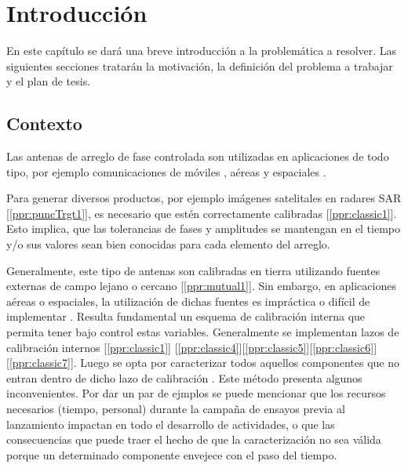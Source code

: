 
\chapter{Introducción} %

\label{ch:introduccion} %

En este capítulo se dará una breve introducción a la problemática a resolver. Las siguientes secciones tratarán la motivación,
la definición del problema a trabajar y el plan de tesis.

\section{Contexto}
    
Las antenas de arreglo de fase controlada \cite{Fenn2000} son utilizadas en aplicaciones de todo tipo, por ejemplo comunicaciones 
de móviles \cite{Chen2012}, aéreas 
								   \cite{ppr:punc-ext1} y espaciales \cite{Shimada1995}\cite{Makhoul2012}. 

Para generar diversos productos, por ejemplo imágenes satelitales en radares SAR 
[\ref{ppr:puncTrgt1}], es necesario que estén 
correctamente calibradas 
[\ref{ppr:classic1}]\cite{Seifert1996}\cite{Dall1994}. Esto implica, que las tolerancias de
fases y amplitudes se mantengan en el tiempo y/o sus valores sean bien conocidas
para cada elemento del arreglo.

Generalmente, este tipo de antenas son calibradas en tierra utilizando fuentes 
externas de campo lejano o cercano [\ref{ppr:mutual1}]. Sin embargo, en 
aplicaciones aéreas o espaciales, la utilización de dichas fuentes es impráctica
o difícil de implementar \cite{Aumann1989}. Resulta fundamental un esquema de
calibración interna que permita tener bajo control estas variables. Generalmente
se implementan lazos de calibración internos [\ref{ppr:classic1}]
\cite{Seifert1996}\cite{Dall1994}\cite{Freeman1995}
[\ref{ppr:classic4}][\ref{ppr:classic5}][\ref{ppr:classic6}]
\cite{Srivastava1996}[\ref{ppr:classic7}]\cite{Makhoul2012}. 
Luego se opta por caracterizar todos aquellos componentes que no entran dentro 
de dicho lazo de calibración \cite{Freeman1995}.
Este método presenta algunos inconvenientes. Por dar un par de ejmplos se puede
mencionar que los recursos necesarios (tiempo, personal) durante la campaña de 
ensayos previa al lanzamiento impactan en todo el desarrollo de actividades, o
que las consecuencias que puede traer el hecho de que la caracterización no sea
válida porque un determinado componente envejece con el paso del tiempo.

